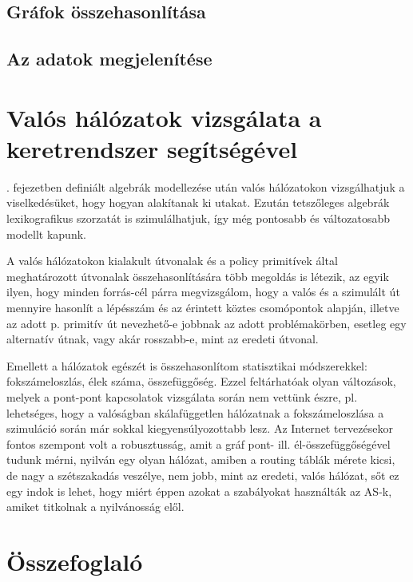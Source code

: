     \subsection{Gráfok összehasonlítása}
    \subsection{Az adatok megjelenítése}

  \section{Valós hálózatok vizsgálata a keretrendszer segítségével}
  . fejezetben definiált algebrák modellezése után valós hálózatokon vizsgálhatjuk a viselkedésüket, hogy hogyan alakítanak ki utakat. Ezután tetszőleges algebrák lexikografikus szorzatát is szimulálhatjuk, így még pontosabb és változatosabb modellt kapunk.

  A valós hálózatokon kialakult útvonalak és a policy primitívek által meghatározott útvonalak összehasonlítására több megoldás is létezik, az egyik ilyen, hogy minden forrás-cél párra megvizsgálom, hogy a valós és a szimulált út mennyire hasonlít a lépésszám és az érintett köztes csomópontok alapján, illetve az adott p. primitív út nevezhető-e jobbnak az adott problémakörben, esetleg egy alternatív útnak, vagy akár rosszabb-e, mint az eredeti útvonal.

  Emellett a hálózatok egészét is összehasonlítom statisztikai módszerekkel: fokszámeloszlás, élek száma, összefüggőség. Ezzel feltárhatóak olyan változások, melyek a pont-pont kapcsolatok vizsgálata során nem vettünk észre, pl. lehetséges, hogy a valóságban skálafüggetlen hálózatnak a fokszámeloszlása a szimuláció során már sokkal kiegyensúlyozottabb lesz. Az Internet tervezésekor fontos szempont volt a robusztusság, amit a gráf pont- ill. él-összefüggőségével tudunk mérni, nyilván egy olyan hálózat, amiben a routing táblák mérete kicsi, de nagy a szétszakadás veszélye, nem jobb, mint az eredeti, valós hálózat, sőt ez egy indok is lehet, hogy miért éppen azokat a szabályokat használták az AS-k, amiket titkolnak a nyilvánosság elől.

  \section{Összefoglaló}
